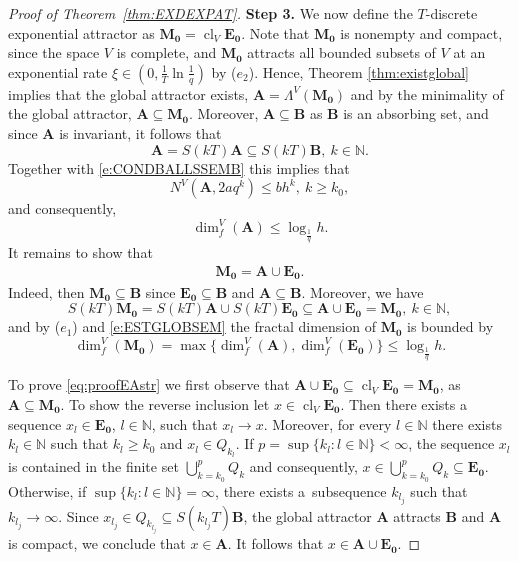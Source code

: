 \documentclass[a4paper,12pt,reqno]{amsart}
\theoremstyle{plain}
\theoremstyle{definition}
\numberwithin{equation}{section}
\newcommand{\N}{\mathbb{N}}
\newcommand{\dimf}{\operatorname{dim}_{f}}
\newcommand{\cl}{\operatorname{cl}}
\renewcommand{\geq}{\geqslant}
\renewcommand{\leq}{\leqslant}
\begin{document}
\begin{proof}[Proof of Theorem~\ref{thm:EXDEXPAT}]
\textbf{Step 3.}
We now define the $T$-discrete exponential attractor as $\mathbf{M_0}=\cl_{V}\mathbf{E_0}$.
Note that $\mathbf{M_0}$ is nonempty and compact, since the space $V$ is complete, and $\mathbf{M_0}$ attracts all bounded subsets of $V$ at an exponential rate $\xi\in(0,\frac{1}{T}\ln \frac{1}{q})$ by  ($e_2$).
Hence, Theorem \ref{thm:existglobal} implies that the global attractor exists, $\mathbf{A}=\Lambda^{V}(\mathbf{M_0})$ and by the minimality of the global attractor, $\mathbf{A}\subseteq \mathbf{M_0}$.  Moreover, $\mathbf{A}\subseteq\mathbf{B}$ as 
$\mathbf{B}$ is an absorbing set, and since $\mathbf{A}$ is invariant, it follows that
$$\mathbf{A}=S(kT)\mathbf{A}\subseteq S(kT)\mathbf{B},\ k\in\N.$$
Together with \eqref{e:CONDBALLSSEMB} this implies that
$$N^{V}(\mathbf{A}, 2a q^k)\leq bh^k,\ k\geq k_0,$$
and consequently, 
\begin{equation}\label{e:ESTGLOBSEM}
\dimf^{V}(\mathbf{A})\leq\log_{\frac{1}{q}}h.
\end{equation}
It remains to show that 
\begin{align}\label{eq:proofEAstr}
\mathbf{M_0}=\mathbf{A}\cup\mathbf{E_0}.
\end{align}
Indeed, then  $\mathbf{M_0}\subseteq \mathbf{B}$ since $\mathbf{E_0}\subseteq \mathbf{B}$ and $\mathbf{A}\subseteq \mathbf{B}$. 
Moreover, we have
$$S(kT)\mathbf{M_0}=S(kT)\mathbf{A}\cup S(kT)\mathbf{E_0}\subseteq \mathbf{A}\cup \mathbf{E_0}=\mathbf{M_0},\ k\in\N,$$
and  by ($e_1$) and \eqref{e:ESTGLOBSEM} the fractal dimension of $\mathbf{M_0}$ is bounded by 
\begin{equation*}
\dimf^{V}(\mathbf{M_0})=\max\{\dimf^{V}(\mathbf{A}),\dimf^{V}(\mathbf{E_0})\}\leq\log_{\frac{1}{q}}h.
\end{equation*}

To prove \eqref{eq:proofEAstr} we first observe that $\mathbf{A}\cup\mathbf{E_0}\subseteq \cl_{V}\mathbf{E_0}=\mathbf{M_0}$, as $\mathbf{A}\subseteq\mathbf{M_0}$. To show the reverse inclusion
let $x\in\cl_{V}\mathbf{E_0}$. Then there exists a sequence $x_l\in\mathbf{E_0}$, $l\in\N$, such that $x_{l}\to x$. 
Moreover, for every $l\in\N$ there exists $k_l\in\N$ such that $k_{l}\geq k_0$ and $x_l\in Q_{k_l}$.
If $p=\sup\{k_l\colon l\in\N\}<\infty$, the sequence $x_l$ is contained in the finite set
$\bigcup_{k=k_0}^{p}Q_k$ and consequently, $x\in\bigcup_{k=k_0}^{p}Q_k\subseteq\mathbf{E_0}$.
Otherwise, if $\sup\{k_l\colon l\in\N\}=\infty$, there exists a~subsequence $k_{l_j}$ such that $k_{l_{j}}\to\infty$.
Since $x_{l_j}\in Q_{k_{l_{j}}}\subseteq S(k_{l_j}T)\mathbf{B}$, the global attractor $\mathbf{A}$ attracts $\mathbf{B}$ and $\mathbf{A}$ is compact, we conclude that $x\in\mathbf{A}$. It follows that $x\in\mathbf{A}\cup\mathbf{E_0}$.
\end{proof}
\end{document}
